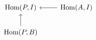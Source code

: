 \documentclass[12pt]{standalone}
\begin{document}
        $$

\begin{tikzcd}
\operatorname{Hom}(P,I) &  \operatorname{Hom}(A,I) \ar[l] \\
\operatorname{Hom}(P,B) \ar[u] & 
\end{tikzcd}
        $$
        
\end{document}
